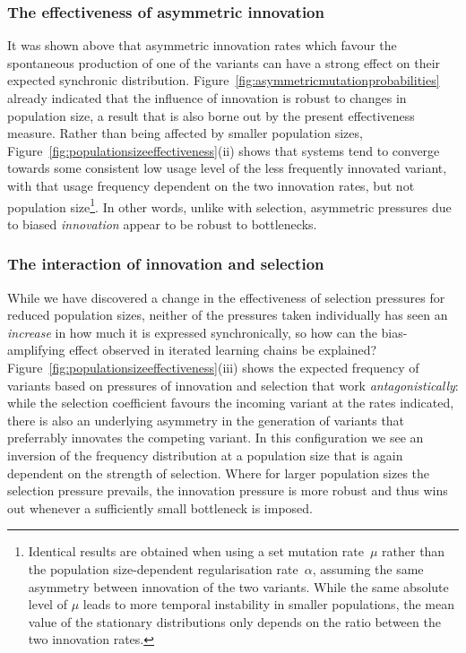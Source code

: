 \subsubsection{The effectiveness of asymmetric innovation}

It was shown above that asymmetric innovation rates which favour the spontaneous production of one of the variants can have a strong effect on their expected synchronic distribution. Figure~\ref{fig:asymmetricmutationprobabilities} already indicated that the influence of innovation is robust to changes in population size, a result that is also borne out by the present effectiveness measure. Rather than being affected by smaller population sizes, Figure~\ref{fig:populationsizeeffectiveness}(ii) shows that systems tend to converge towards some consistent low usage level of the less frequently innovated variant, with that usage frequency dependent on the two innovation rates, but not population size\footnote{Identical results are obtained when using a set mutation rate~$\mu$ rather than the population size-dependent regularisation rate~$\alpha$, assuming the same asymmetry between innovation of the two variants. While the same absolute level of $\mu$ leads to more temporal instability in smaller populations, the mean value of the stationary distributions only depends on the ratio between the two innovation rates.}. In other words, unlike with selection, asymmetric pressures due to biased \emph{innovation} appear to be robust to bottlenecks.


\subsubsection{The interaction of innovation and selection}

While we have discovered a change in the effectiveness of selection pressures for reduced population sizes, neither of the pressures taken individually has seen an \emph{increase} in how much it is expressed synchronically, so how can the bias-amplifying effect observed in iterated learning chains be explained? Figure~\ref{fig:populationsizeeffectiveness}(iii) shows the expected frequency of variants based on pressures of innovation and selection that work \emph{antagonistically}: while the selection coefficient favours the incoming variant at the rates indicated, there is also an underlying asymmetry in the generation of variants that preferrably innovates the competing variant.
In this configuration we see an inversion of the frequency distribution at a population size that is again dependent on the strength of selection. Where for larger population sizes the selection pressure prevails, the innovation pressure is more robust and thus wins out whenever a sufficiently small bottleneck is imposed.

